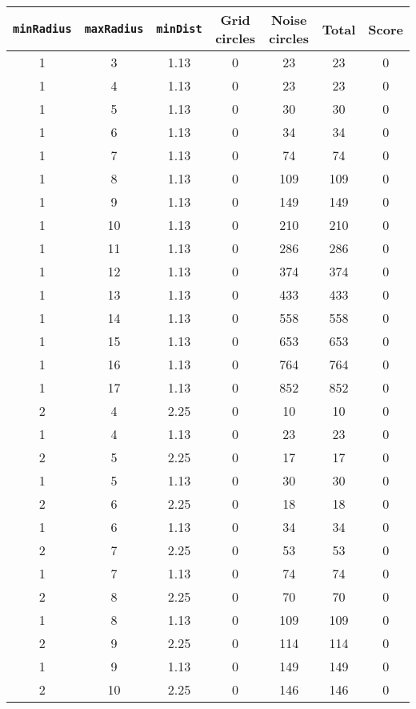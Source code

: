 \documentclass[letterpaper, 12pt]{article}
\begin{document}
\begin{longtable}{|c|c|c|c|c|c|c|}
\hline
\textbf{\texttt{minRadius}} & \textbf{\texttt{maxRadius}} & \textbf{\texttt{minDist}} & \textbf{Grid circles} & \textbf{Noise circles} & \textbf{Total} & \textbf{Score} \\
\hline
1 & 3 & 1.13 & 0 & 23 & 23 & 0 \\
\hline
1 & 4 & 1.13 & 0 & 23 & 23 & 0 \\
\hline
1 & 5 & 1.13 & 0 & 30 & 30 & 0 \\
\hline
1 & 6 & 1.13 & 0 & 34 & 34 & 0 \\
\hline
1 & 7 & 1.13 & 0 & 74 & 74 & 0 \\
\hline
1 & 8 & 1.13 & 0 & 109 & 109 & 0 \\
\hline
1 & 9 & 1.13 & 0 & 149 & 149 & 0 \\
\hline
1 & 10 & 1.13 & 0 & 210 & 210 & 0 \\
\hline
1 & 11 & 1.13 & 0 & 286 & 286 & 0 \\
\hline
1 & 12 & 1.13 & 0 & 374 & 374 & 0 \\
\hline
1 & 13 & 1.13 & 0 & 433 & 433 & 0 \\
\hline
1 & 14 & 1.13 & 0 & 558 & 558 & 0 \\
\hline
1 & 15 & 1.13 & 0 & 653 & 653 & 0 \\
\hline
1 & 16 & 1.13 & 0 & 764 & 764 & 0 \\
\hline
1 & 17 & 1.13 & 0 & 852 & 852 & 0 \\
\hline
2 & 4 & 2.25 & 0 & 10 & 10 & 0 \\
\hline
1 & 4 & 1.13 & 0 & 23 & 23 & 0 \\
\hline
2 & 5 & 2.25 & 0 & 17 & 17 & 0 \\
\hline
1 & 5 & 1.13 & 0 & 30 & 30 & 0 \\
\hline
2 & 6 & 2.25 & 0 & 18 & 18 & 0 \\
\hline
1 & 6 & 1.13 & 0 & 34 & 34 & 0 \\
\hline
2 & 7 & 2.25 & 0 & 53 & 53 & 0 \\
\hline
1 & 7 & 1.13 & 0 & 74 & 74 & 0 \\
\hline
2 & 8 & 2.25 & 0 & 70 & 70 & 0 \\
\hline
1 & 8 & 1.13 & 0 & 109 & 109 & 0 \\
\hline
2 & 9 & 2.25 & 0 & 114 & 114 & 0 \\
\hline
1 & 9 & 1.13 & 0 & 149 & 149 & 0 \\
\hline
2 & 10 & 2.25 & 0 & 146 & 146 & 0 \\
\hline

\end{longtable}
\end{document}
